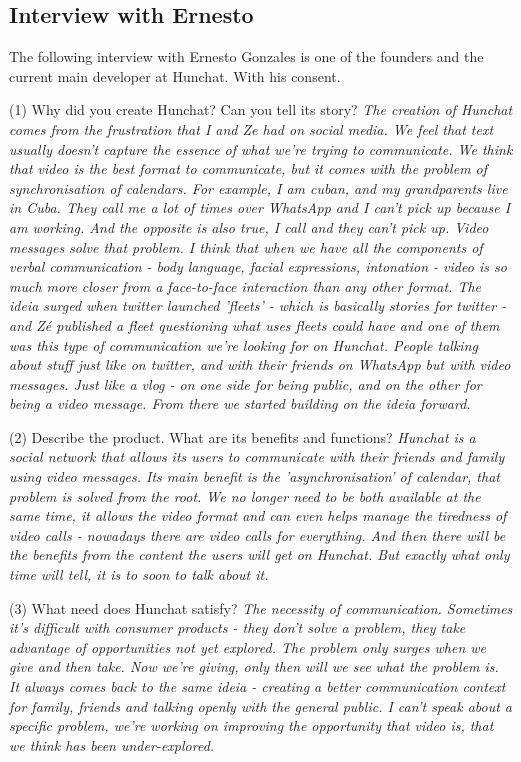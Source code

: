 \documentclass[12pt]{article}
\begin{document}
\subsection{Interview with Ernesto} \label{ernesto}
The following interview with Ernesto Gonzales is one of the founders and the current main developer at Hunchat. With his consent.

(1) Why did you create Hunchat? Can you tell its story? \textit{The creation of Hunchat comes from the frustration that I and Ze had on social media. We feel that text usually doesn't capture the essence of what we're trying to communicate. We think that video is the best format to communicate, but it comes with the problem of synchronisation of calendars. For example, I am cuban, and my grandparents live in Cuba. They call me a lot of times over WhatsApp and I can't pick up because I am working. And the opposite is also true, I call and they can't pick up. Video messages solve that problem. I think that when we have all the components of verbal communication - body language, facial expressions, intonation - video is so much more closer from a face-to-face interaction than any other format. The ideia surged when twitter launched 'fleets' - which is basically stories for twitter - and Zé published a fleet questioning what uses fleets could have and one of them was this type of communication we're looking for on Hunchat. People talking about stuff just like on twitter, and with their friends on WhatsApp but with video messages. Just like a vlog - on one side for being public, and on the other for being a video message. From there we started building on the ideia forward.}

(2) Describe the product. What are its benefits and functions? \textit{Hunchat is a social network that allows its users to communicate with their friends and family using video messages. Its main benefit is the 'asynchronisation' of calendar, that problem is solved from the root. We no longer need to be both available at the same time, it allows the video format and can even helps manage the tiredness of video calls - nowadays there are video calls for everything. And then there will be the benefits from the content the users will get on Hunchat. But exactly what only time will tell, it is to soon to talk about it.}

(3) What need does Hunchat satisfy? \textit{The necessity of communication. Sometimes it's difficult with consumer products - they don't solve a problem, they take advantage of opportunities not yet explored. The problem only surges when we give and then take. Now we're giving, only then will we see what the problem is. It always comes back to the same ideia - creating a better communication context for family, friends and talking openly with the general public. I can't speak about a specific problem, we're working on improving the opportunity that video is, that we think has been under-explored.}
\end{document}
